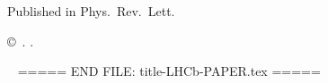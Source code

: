 \begin{titlepage}
\begin{abstract}
\end{abstract}

\vspace*{2.0cm}

\begin{center}
  Published in
  Phys.~Rev.~Lett.
\end{center}

\vspace{\fill}

{\footnotesize

\centerline{\copyright~\papercopyright. \href{\paperlicenceurl}{\paperlicence}.}}
\vspace*{2mm}

\end{titlepage}







\newpage
\setcounter{page}{2}
\mbox{~}
===== END FILE: title-LHCb-PAPER.tex =====
